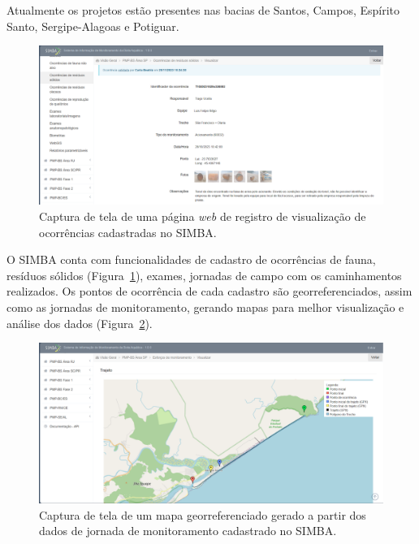 Atualmente os projetos estão presentes nas bacias de Santos, Campos, Espírito Santo, Sergipe-Alagoas e Potiguar.

\begin{figure}[htb]
  \centering
  \includegraphics[width=1\textwidth]{imagens/simbaRegistro.png}
  \caption{Captura de tela de uma página \textit{web} de registro de visualização de ocorrências cadastradas no SIMBA.}
  \label{fig:simbaRegistro}
\end{figure}

O SIMBA conta com funcionalidades de cadastro de ocorrências de fauna, resíduos sólidos (Figura~\ref{fig:simbaRegistro}), exames, jornadas de campo com os caminhamentos realizados. Os pontos de ocorrência de cada cadastro são georreferenciados, assim como as jornadas de monitoramento, gerando mapas para melhor visualização e análise dos dados (Figura~\ref{fig:simbaMonitoramento}).

\begin{figure}[htb]
  \centering
  \includegraphics[width=1\textwidth]{imagens/simbaTrajetoria.png}
  \caption{Captura de tela de um mapa georreferenciado gerado a partir dos dados de jornada de monitoramento cadastrado no SIMBA.}
  \label{fig:simbaMonitoramento}
\end{figure}

